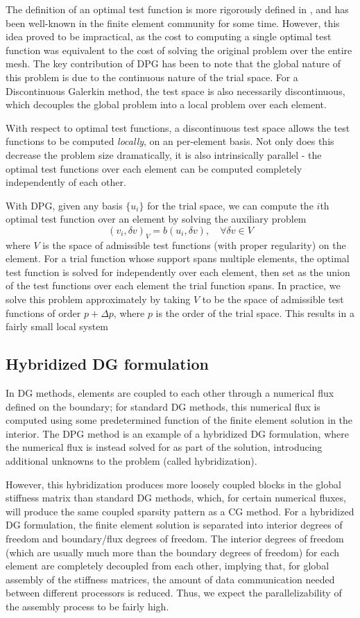 \documentclass{article}
\begin{document}
The definition of an optimal test function is more rigorously defined in \cite{DPG2}, and has been well-known in the finite element community for some time. However, this idea proved to be impractical, as the cost to computing a single optimal test function was equivalent to the cost of solving the original problem over the entire mesh. The key contribution of DPG has been to note that the global nature of this problem is due to the continuous nature of the trial space. For a Discontinuous Galerkin method, the test space is also necessarily discontinuous, which decouples the global problem into a local problem over each element. 

With respect to optimal test functions, a discontinuous test space allows the test functions to be computed \emph{locally}, on an per-element basis. Not only does this decrease the problem size dramatically, it is also intrinsically parallel - the optimal test functions over each element can be computed completely independently of each other. 

With DPG, given any basis $\{u_i\}$ for the trial space, we can compute the $i$th optimal test function over an element by solving the auxiliary problem 
\[
(v_i, \delta v)_V = b(u_i,\delta v), \quad \forall \delta v\in V
\]
where $V$ is the space of admissible test functions (with proper regularity) on the element. For a trial function whose support spans multiple elements, the optimal test function is solved for independently over each element, then set as the union of the test functions over each element the trial function spans. In practice, we solve this problem approximately by taking $V$ to be the space of admissible test functions of order $p+\Delta p$, where $p$ is the order of the trial space. This results in a fairly small local system 

\subsection{Hybridized DG formulation}

In DG methods, elements are coupled to each other through a numerical flux defined on the boundary; for standard DG methods, this numerical flux is computed using some predetermined function of the finite element solution in the interior. The DPG method is an example of a hybridized DG formulation, where the numerical flux is instead solved for as part of the solution, introducing additional unknowns to the problem (called hybridization). 

However, this hybridization produces more loosely coupled blocks in the global stiffness matrix than standard DG methods, which, for certain numerical fluxes, will produce the same coupled sparsity pattern as a CG method. For a hybridized DG formulation, the finite element solution is separated into interior degrees of freedom and boundary/flux degrees of freedom. The interior degrees of freedom (which are usually much more than the boundary degrees of freedom) for each element are completely decoupled from each other, implying that, for global assembly of the stiffness matrices, the amount of data communication needed between different processors is reduced. Thus, we expect the parallelizability of the assembly process to be fairly high. 
\end{document}
